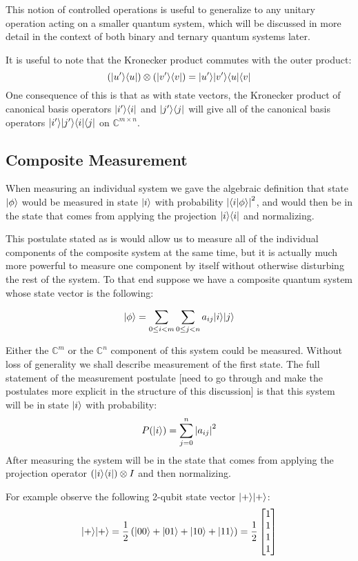 This notion of controlled operations is useful to generalize to any unitary operation acting on a smaller quantum system, which will be discussed in more detail in the context of both binary and ternary quantum systems later.

It is useful to note that the Kronecker product commutes with the outer product:
\[(| u' \rangle\langle u |)\otimes(| v' \rangle\langle v |) = | u' \rangle| v' \rangle\langle u |\langle v |\]
One consequence of this is that as with state vectors, the Kronecker product of canonical basis operators $| i' \rangle\langle i |$ and $| j' \rangle\langle j |$ will give all of the canonical basis operators $| i' \rangle| j' \rangle\langle i |\langle j |$ on $\mathbb{C}^{m \times n}$.
\subsection{Composite Measurement}
When measuring an individual system we gave the algebraic definition that state $| \phi \rangle$ would be measured in state $| i \rangle$ with probability $\left| \langle i | \phi \rangle \right|^2$, and would then be in the state that comes from applying the projection $| i \rangle\langle i |$ and normalizing.

This postulate stated as is would allow us to measure all of the individual components of the composite system at the same time, but it is actually much more powerful to measure one component by itself without otherwise disturbing the rest of the system. To that end suppose we have a composite quantum system whose state vector is the following:

\[| \phi \rangle = \sum_{0 \leq i < m}\sum_{0 \leq j < n} a_{ij}| i \rangle| j \rangle\]

Either the $\mathbb{C}^m$ or the $\mathbb{C}^n$ component of this system could be measured. Without loss of generality we shall describe measurement of the first state. The full statement of the measurement postulate [need to go through and make the postulates more explicit in the structure of this discussion] is that this system will be in state $| i \rangle$ with probability:
\[P(| i \rangle) = \sum_{j=0}^n\left| a_{ij} \right|^2\]
After measuring the system will be in the state that comes from applying the projection operator $(| i \rangle\langle i |)\otimes I$ and then normalizing.

For example observe the following 2-qubit state vector $| + \rangle| + \rangle$:
\[| + \rangle| + \rangle=\frac{1}{2}\left(| 00 \rangle+| 01 \rangle+| 10 \rangle+| 11 \rangle\right)=\frac{1}{2}\left[\begin{matrix}
1\\
1\\
1\\
1
\end{matrix}\right]\]

